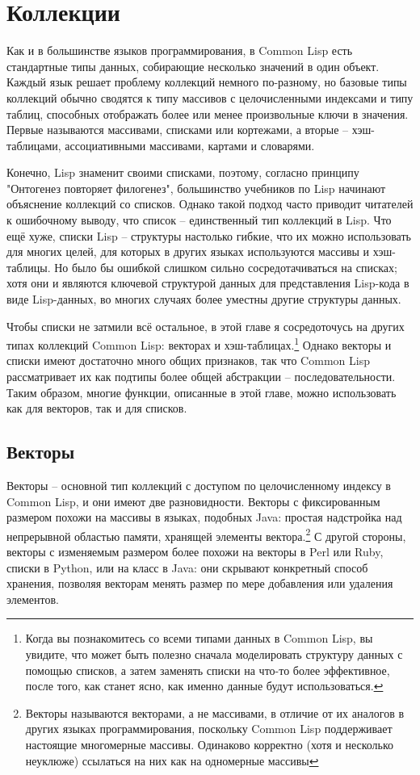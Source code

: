 \chapter{Коллекции}
\label{ch:11}

Как и в большинстве языков программирования, в Common Lisp есть стандартные типы данных,
собирающие несколько значений в один объект.  Каждый язык решает проблему коллекций
немного по-разному, но базовые типы коллекций обычно сводятся к типу массивов с целочисленными
индексами и типу таблиц, способных отображать более или менее
произвольные ключи в значения.  Первые называются массивами, списками или кортежами, а
вторые -- хэш-таблицами, ассоциативными массивами, картами и словарями.

Конечно, Lisp знаменит своими списками, поэтому, согласно принципу "Онтогенез повторяет
филогенез", большинство учебников по Lisp начинают объяснение коллекций со
списков. Однако такой подход часто приводит читателей к ошибочному выводу, что
список -- единственный тип коллекций в Lisp.  Что ещё хуже,
списки Lisp -- структуры настолько гибкие, что их можно использовать для многих целей, для
которых в других языках используются массивы и хэш-таблицы.  Но было бы ошибкой слишком
сильно сосредотачиваться на списках; хотя они и являются ключевой структурой данных для
представления Lisp-кода в виде Lisp-данных, во многих случаях более уместны другие структуры данных.

Чтобы списки не затмили всё остальное, в этой главе я сосредоточусь на других типах
коллекций Common Lisp: векторах и хэш-таблицах.\footnote{Когда вы познакомитесь со всеми
  типами данных в Common Lisp, вы увидите, что может быть полезно сначала моделировать
  структуру данных с помощью списков, а затем заменять списки на что-то более 
  эффективное, после того, как станет ясно, как именно данные будут использоваться.}
Однако векторы и списки имеют достаточно много общих признаков, так что Common Lisp
рассматривает их как подтипы более общей абстракции -- последовательности.  Таким образом,
многие функции, описанные в этой главе, можно использовать как для векторов, так и для
списков.

\section{Векторы}

Векторы -- основной тип коллекций с доступом по целочисленному индексу в Common Lisp, и они
имеют две разновидности.  Векторы с фиксированным размером похожи на массивы в языках,
подобных Java: простая надстройка над непрерывной областью памяти, хранящей элементы
вектора.\footnote{Векторы называются векторами, а не массивами, в отличие от их аналогов в других
  языках программирования, поскольку Common Lisp поддерживает настоящие многомерные
  массивы.  Одинаково корректно (хотя и несколько неуклюже) ссылаться на них как на
  одномерные массивы} С другой стороны, векторы с изменяемым размером более похожи на
векторы в Perl или Ruby, списки в Python, или на класс  в Java: они скрывают
конкретный способ хранения, позволяя векторам менять размер по мере добавления или
удаления элементов.

